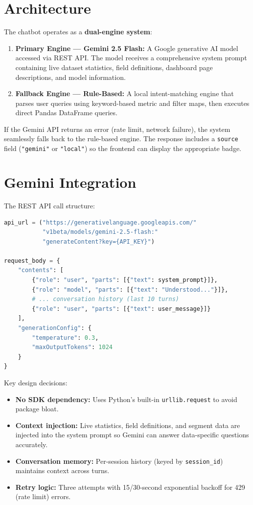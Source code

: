 \documentclass[12pt, a4paper]{report}
\begin{document}
\section{Architecture}

The chatbot operates as a \textbf{dual-engine system}:

\begin{enumerate}
    \item \textbf{Primary Engine --- Gemini 2.5 Flash:} A Google generative AI model accessed via REST API. The model receives a comprehensive system prompt containing live dataset statistics, field definitions, dashboard page descriptions, and model information.
    \item \textbf{Fallback Engine --- Rule-Based:} A local intent-matching engine that parses user queries using keyword-based metric and filter maps, then executes direct Pandas DataFrame queries.
\end{enumerate}

If the Gemini API returns an error (rate limit, network failure), the system seamlessly falls back to the rule-based engine. The response includes a \texttt{source} field (\texttt{"gemini"} or \texttt{"local"}) so the frontend can display the appropriate badge.

\section{Gemini Integration}

The REST API call structure:

\begin{lstlisting}[language=Python, caption={Gemini REST API Call}]
api_url = ("https://generativelanguage.googleapis.com/"
           "v1beta/models/gemini-2.5-flash:"
           "generateContent?key={API_KEY}")

request_body = {
    "contents": [
        {"role": "user", "parts": [{"text": system_prompt}]},
        {"role": "model", "parts": [{"text": "Understood..."}]},
        # ... conversation history (last 10 turns)
        {"role": "user", "parts": [{"text": user_message}]}
    ],
    "generationConfig": {
        "temperature": 0.3,
        "maxOutputTokens": 1024
    }
}
\end{lstlisting}

Key design decisions:
\begin{itemize}
    \item \textbf{No SDK dependency:} Uses Python's built-in \texttt{urllib.request} to avoid package bloat.
    \item \textbf{Context injection:} Live statistics, field definitions, and segment data are injected into the system prompt so Gemini can answer data-specific questions accurately.
    \item \textbf{Conversation memory:} Per-session history (keyed by \texttt{session\_id}) maintains context across turns.
    \item \textbf{Retry logic:} Three attempts with 15/30-second exponential backoff for 429 (rate limit) errors.
\end{itemize}
\end{document}
